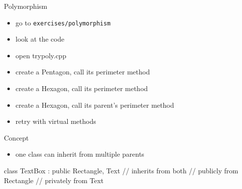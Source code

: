 \begin{frame}[fragile]
  \begin{exercise}{Polymorphism}
    \begin{itemize}
    \item go to \texttt{exercises/polymorphism}
    \item look at the code
    \item open trypoly.cpp
    \item create a Pentagon, call its perimeter method
    \item create a Hexagon, call its perimeter method
    \item create a Hexagon, call its parent's perimeter method
    \item retry with virtual methods
    \end{itemize}
  \end{exercise}
\end{frame}

\begin{frame}[fragile]
  \begin{block}{Concept}
    \begin{itemize}
    \item one class can inherit from multiple parents
    \end{itemize}
  \end{block}
  \begin{multicols}{2}
    \columnbreak
    \vspace{2cm}
    \begin{cppcode*}{}
      class TextBox :
        public Rectangle, Text {
        // inherits from both
        // publicly from Rectangle
        // privately from Text
      }
    \end{cppcode*}
  \end{multicols}
\end{frame}

